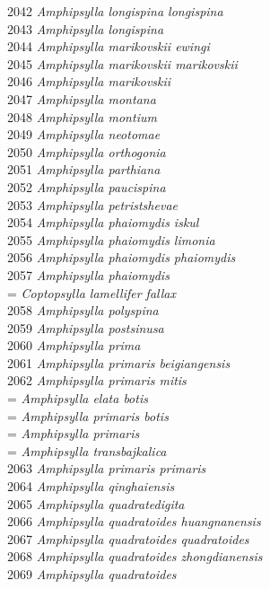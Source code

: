 \documentclass[
]{article}
\begin{document}
2042 \emph{Amphipsylla longispina longispina}\\
2043 \emph{Amphipsylla longispina}\\
2044 \emph{Amphipsylla marikovskii ewingi}\\
2045 \emph{Amphipsylla marikovskii marikovskii}\\
2046 \emph{Amphipsylla marikovskii}\\
2047 \emph{Amphipsylla montana}\\
2048 \emph{Amphipsylla montium}\\
2049 \emph{Amphipsylla neotomae}\\
2050 \emph{Amphipsylla orthogonia}\\
2051 \emph{Amphipsylla parthiana}\\
2052 \emph{Amphipsylla paucispina}\\
2053 \emph{Amphipsylla petristshevae}\\
2054 \emph{Amphipsylla phaiomydis iskul}\\
2055 \emph{Amphipsylla phaiomydis limonia}\\
2056 \emph{Amphipsylla phaiomydis phaiomydis}\\
2057 \emph{Amphipsylla phaiomydis}\\
= \emph{Coptopsylla lamellifer fallax}\\
2058 \emph{Amphipsylla polyspina}\\
2059 \emph{Amphipsylla postsinusa}\\
2060 \emph{Amphipsylla prima}\\
2061 \emph{Amphipsylla primaris beigiangensis}\\
2062 \emph{Amphipsylla primaris mitis}\\
= \emph{Amphipsylla elata botis}\\
= \emph{Amphipsylla primaris botis}\\
= \emph{Amphipsylla primaris}\\
= \emph{Amphipsylla transbajkalica}\\
2063 \emph{Amphipsylla primaris primaris}\\
2064 \emph{Amphipsylla qinghaiensis}\\
2065 \emph{Amphipsylla quadratedigita}\\
2066 \emph{Amphipsylla quadratoides huangnanensis}\\
2067 \emph{Amphipsylla quadratoides quadratoides}\\
2068 \emph{Amphipsylla quadratoides zhongdianensis}\\
2069 \emph{Amphipsylla quadratoides}\\
\end{document}
